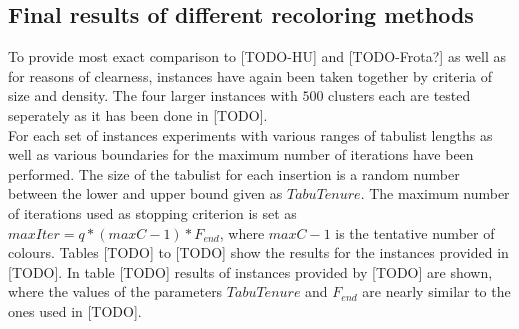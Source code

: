 \clearpage

\subsection{Final results of different recoloring methods}
To provide most exact comparison to [TODO-HU] and [TODO-Frota?] as well as for reasons of clearness, instances have again been taken together by criteria of size and density. The four larger instances with $500$ clusters each are tested seperately as it has been done in [TODO].\\
For each set of instances experiments with various ranges of tabulist lengths as well as various boundaries for the maximum number of iterations have been performed. The size of the tabulist for each insertion is a random number between the lower and upper bound given as $TabuTenure$. The maximum number of iterations used as stopping criterion is set as $maxIter=q*(maxC-1)*F_{end}$, where $maxC-1$ is the tentative number of colours. Tables [TODO] to [TODO] show the results for the instances provided in [TODO]. In table [TODO] results of instances provided by [TODO] are shown, where the values of the parameters $TabuTenure$ and $F_{end}$ are nearly similar to the ones used in [TODO].\\

